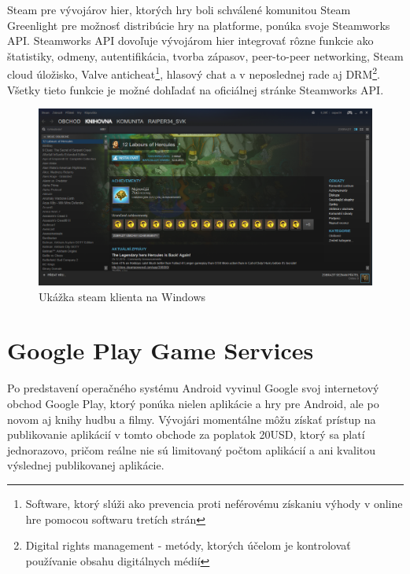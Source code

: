 Steam pre vývojárov hier, ktorých hry boli schválené komunitou Steam Greenlight pre možnosť distribúcie hry na platforme, ponúka svoje Steamworks API. Steamworks API dovoľuje vývojárom hier integrovať rôzne funkcie ako štatistiky, odmeny, autentifikácia, tvorba zápasov, peer-to-peer networking, Steam cloud úložisko, Valve anticheat\footnote{Software, ktorý slúži ako prevencia proti neférovému získaniu výhody v online hre pomocou softwaru tretích strán}, hlasový chat a v neposlednej rade aj DRM\footnote{Digital rights management - metódy, ktorých účelom je kontrolovať používanie obsahu digitálnych médií}. Všetky tieto funkcie je možné dohľadať na oficiálnej stránke Steamworks API. \cite{steamworks}
\begin{figure}[h]
  \centering
  \includegraphics[scale=0.27]{fig/steam.png}
  \caption{Ukážka steam klienta na Windows}
  \label{fig:steam}
\end{figure}

\section{Google Play Game Services}
Po predstavení operačného systému Android vyvinul Google svoj internetový obchod Google Play, ktorý ponúka nielen aplikácie a hry pre Android, ale po novom aj knihy hudbu a filmy. Vývojári momentálne môžu získať prístup na publikovanie aplikácií  v tomto obchode za poplatok 20USD, ktorý sa platí jednorazovo, pričom reálne nie sú limitovaný počtom aplikácií a ani kvalitou výslednej publikovanej aplikácie.


